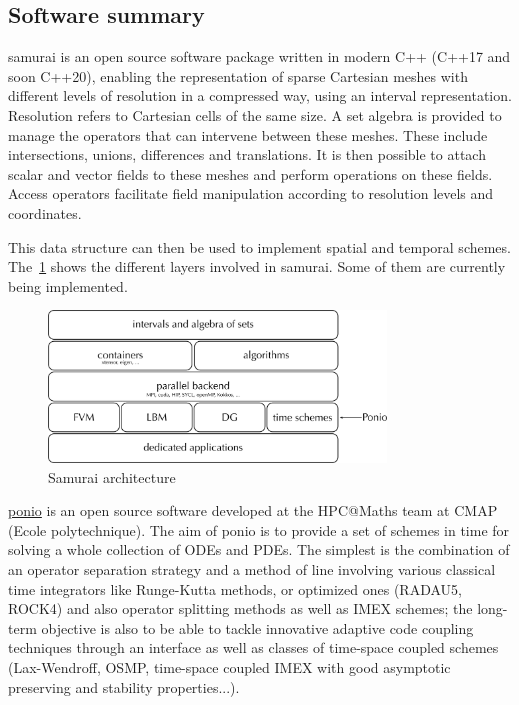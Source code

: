 \subsection{Software summary}
\label{sec:Samurai:summary}

samurai is an open source software package written in modern C++ (C++17 and soon C++20), enabling the representation of sparse Cartesian meshes with different levels of resolution in a compressed way, using an interval representation. Resolution refers to Cartesian cells of the same size. A set algebra is provided to manage the operators that can intervene between these meshes. These include intersections, unions, differences and translations.
It is then possible to attach scalar and vector fields to these meshes and perform operations on these fields. Access operators facilitate field manipulation according to resolution levels and coordinates.

This data structure can then be used to implement spatial and temporal schemes. The~\cref{fig:Samurai:architecture} shows the different layers involved in samurai. Some of them are currently being implemented.

\begin{figure}[h!]
    \centering
    \includegraphics[width=0.8\textwidth]{graphics/samurai/samurai.png}
    \caption{Samurai architecture}
    \label{fig:Samurai:architecture}
\end{figure}

\href{https://github.com/hpc-maths/ponio}{ponio} is an open source software developed at the HPC@Maths team at CMAP (Ecole polytechnique). The aim of ponio is to provide a set of schemes in time for solving a whole collection of ODEs and PDEs. The simplest is the combination of an operator separation strategy and a method of line involving various classical time integrators like Runge-Kutta methods, or optimized ones (RADAU5, ROCK4) and also operator splitting methods as well as IMEX schemes; the long-term objective is also to be able to tackle innovative adaptive code coupling techniques through an interface as well as classes of time-space coupled schemes (Lax-Wendroff, OSMP, time-space coupled IMEX with good asymptotic preserving and stability properties...).

